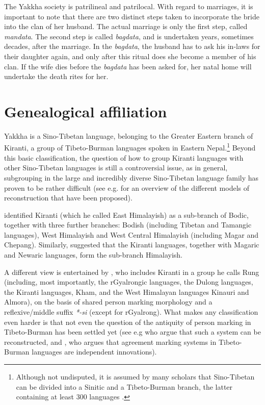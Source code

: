 The Yakkha society is patrilineal and patrilocal. With regard to marriages, it is important to note that there are two distinct steps taken to incorporate the bride into the clan of her husband. The actual marriage is only the first step, called \emph{mandata}. The second step is called \emph{bagdata}, and is undertaken years, sometimes decades, after the marriage. In the \emph{bagdata}, the husband has to ask his in-laws for their daughter again, and only after this ritual does she become a member of his clan. If the wife dies before the \emph{bagdata} has been asked for, her natal home will undertake the death rites for her.

 
\section{Genealogical affiliation}\label{genetic}

Yakkha is a Sino-Tibetan language, belonging to the Greater Eastern branch of Kiranti, a group of Tibeto-Burman languages spoken in Eastern Nepal.\footnote{Although not  undisputed, it is assumed by many scholars that Sino-Tibetan can be divided into a Sinitic and a Tibeto-Burman branch, the latter containing at least 300 languages \citep{Bradley1997_Tibeto-Burman, Matisoff2003Handbook}.}  Beyond this basic classification, the question of how to group Kiranti languages with other Sino-Tibetan languages is still a controversial issue, as in general, subgrouping in the large and incredibly diverse Sino-Tibetan language family has proven to be rather difficult (see e.g. \citealt[Chapter 3]{Hyslop2011_Kurtop} for an overview of the different models of reconstruction that have been proposed).

\citet{Shafer1974_Introduction} identified Kiranti (which he called East Himalayish) as a sub-branch of Bodic, together with three further branches: Bodish (including Tibetan and Tamangic languages), West Himalayish and West Central Himalayish (including Magar and Chepang). Similarly, \citet{Bradley1997_Tibeto-Burman} suggested that the Kiranti languages, together with Magaric and Newaric languages, form the sub-branch Himalayish. 

A different view is entertained by \citet{LaPolla2003_Overview},  who includes Kiranti in a group he calls Rung (including, most importantly, the rGyalrongic languages, the Dulong languages, the Kiranti languages,  Kham, and the West Himalayan languages Kinauri and Almora), on the basis of shared person marking morphology and a reflexive/middle suffix \emph{*-si} (except for rGyalrong).  What makes any classification even harder is that not even the question of the antiquity of person marking in Tibeto-Burman has been settled yet (see e.g \citet{DeLancey2010_Towards, Jacques2012_Agreement} who argue that such a system can be reconstructed, and \citet{LaPolla2001_Role, LaPolla2012_Comments}, who argues that agreement marking systems in Tibeto-Burman languages are independent innovations).

